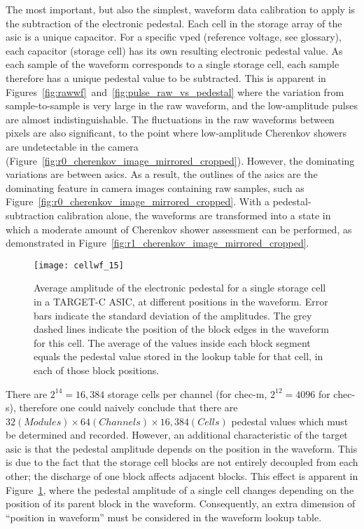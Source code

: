 The most important, but also the simplest, waveform data calibration to apply is the subtraction of the electronic pedestal. Each cell in the storage array of the \gls{asic} is a unique capacitor. For a specific \gls{vped} (reference voltage, see glossary), each capacitor (storage cell) has its own resulting electronic pedestal value. As each sample of the waveform corresponds to a single storage cell, each sample therefore has a unique pedestal value to be subtracted. This is apparent in Figures~\ref{fig:rawwf}~and~\ref{fig:pulse_raw_vs_pedestal} where the variation from sample-to-sample is very large in the raw waveform, and the low-amplitude pulses are almost indistinguishable. The fluctuations in the raw waveforms between pixels are also significant, to the point where low-amplitude Cherenkov showers are undetectable in the camera (Figure~\ref{fig:r0_cherenkov_image_mirrored_cropped}). However, the dominating variations are between \glspl{asic}. As a result, the outlines of the \glspl{asic} are the dominating feature in camera images containing raw samples, such as Figure~\ref{fig:r0_cherenkov_image_mirrored_cropped}. With a pedestal-subtraction calibration alone, the waveforms are transformed into a state in which a moderate amount of Cherenkov shower assessment can be performed, as demonstrated in Figure~\ref{fig:r1_cherenkov_image_mirrored_cropped}.

\begin{figure}
	\centering
    \texttt{[image: cellwf\_15]} 
	\caption[Storage-cell-amplitude dependence on position in the waveform.]{Average amplitude of the electronic pedestal for a single storage cell in a TARGET-C ASIC, at different positions in the waveform. Error bars indicate the standard deviation of the amplitudes. The grey dashed lines indicate the position of the block edges in the waveform for this cell. The average of the values inside each block segment equals the pedestal value stored in the lookup table for that cell, in each of those block positions.} 
	\label{fig:cellwf}
\end{figure}

There are $2^{14} = 16,384$ storage cells per channel (for \gls{chec-m}, $2^{12} = 4096$ for \gls{chec-s}), therefore one could naively conclude that there are $32 (Modules) \times 64 (Channels) \times 16,384 (Cells)$ pedestal values which must be determined and recorded. However, an additional characteristic of the \gls{target} \gls{asic} is that the pedestal amplitude depends on the position in the waveform. This is due to the fact that the storage cell blocks are not entirely decoupled from each other; the discharge of one block affects adjacent blocks. This effect is apparent in Figure~\ref{fig:cellwf}, where the pedestal amplitude of a single cell changes depending on the position of its parent block in the waveform. Consequently, an extra dimension of ``position in waveform'' must be considered in the waveform lookup table.

